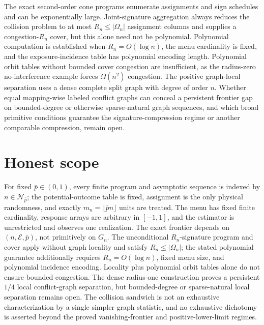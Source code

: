 \documentclass{article}
\begin{document}
The exact second-order cone programs enumerate assignments and sign schedules and can be exponentially large. Joint-signature aggregation always reduces the collision problem to at most \(R_n\le|\Omega_n|\) assignment columns and supplies a congestion-\(R_n\) cover, but this alone need not be polynomial. Polynomial computation is established when \(R_n=O(\log n)\), the menu cardinality is fixed, and the exposure-incidence table has polynomial encoding length. Polynomial orbit tables without bounded cover congestion are insufficient, as the radius-zero no-interference example forces \(\Omega(n^2)\) congestion. The positive graph-local separation uses a dense complete split graph with degree of order \(n\). Whether equal mapping-wise labeled conflict graphs can conceal a persistent frontier gap on bounded-degree or otherwise sparse-natural graph sequences, and which broad primitive conditions guarantee the signature-compression regime or another comparable compression, remain open.

\section{Honest scope}

For fixed \(\bar p\in(0,1)\), every finite program and asymptotic sequence is indexed by \(n\in\mathcal N_{\bar p}\); the potential-outcome table is fixed, assignment is the only physical randomness, and exactly \(m_n=\lfloor\bar p n\rfloor\) units are treated. The menu has fixed finite cardinality, response arrays are arbitrary in \([-1,1]\), and the estimator is unrestricted and observes one realization. The exact frontier depends on \((n,\mathcal E,\bar p)\), not primitively on \(G_n\). The unconditional \(R_n\)-signature program and cover apply without graph locality and satisfy \(R_n\le|\Omega_n|\); the stated polynomial guarantee additionally requires \(R_n=O(\log n)\), fixed menu size, and polynomial incidence encoding. Locality plus polynomial orbit tables alone do not ensure bounded congestion. The dense radius-one construction proves a persistent \(1/4\) local conflict-graph separation, but bounded-degree or sparse-natural local separation remains open. The collision sandwich is not an exhaustive characterization by a single simpler graph statistic, and no exhaustive dichotomy is asserted beyond the proved vanishing-frontier and positive-lower-limit regimes.
\end{document}
